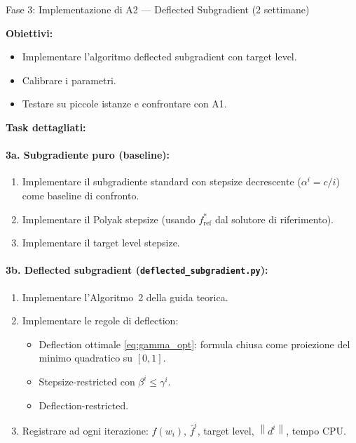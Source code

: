\documentclass[a4paper,11pt]{article}
\newcommand{\norm}[1]{\left\lVert #1 \right\rVert}
\begin{document}
\begin{phasebox}{Fase 3: Implementazione di A2 --- Deflected Subgradient (2 settimane)}

\textbf{Obiettivi:}
\begin{itemize}[nosep]
  \item Implementare l'algoritmo deflected subgradient con target level.
  \item Calibrare i parametri.
  \item Testare su piccole istanze e confrontare con A1.
\end{itemize}

\textbf{Task dettagliati:}

\paragraph{3a. Subgradiente puro (baseline):}
\begin{enumerate}[nosep]
  \item Implementare il subgradiente standard con stepsize decrescente ($\alpha^i = c/i$) come baseline di confronto.
  \item Implementare il Polyak stepsize (usando $f^*_{\text{ref}}$ dal solutore di riferimento).
  \item Implementare il target level stepsize.
\end{enumerate}

\paragraph{3b. Deflected subgradient (\texttt{deflected\_subgradient.py}):}
\begin{enumerate}[nosep]
  \item Implementare l'Algoritmo~2 della guida teorica.
  \item Implementare le regole di deflection:
  \begin{itemize}[nosep]
    \item Deflection ottimale \eqref{eq:gamma_opt}: formula chiusa come proiezione del minimo quadratico su $[0,1]$.
    \item Stepsize-restricted con $\beta^i \leq \gamma^i$.
    \item Deflection-restricted.
  \end{itemize}
  \item Registrare ad ogni iterazione: $f(w_i)$, $\bar{f}^i$, target level, $\norm{d^i}$, tempo CPU.
\end{enumerate}


\end{phasebox}
\end{document}
